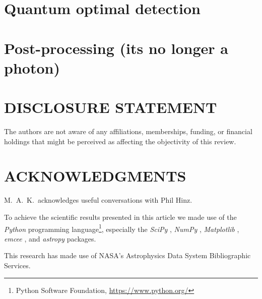 \documentclass[letterpaper]{ar-1col}
\begin{document}
\section{Quantum optimal detection}
\lipsum[2-4]

\section{Post-processing (its no longer a photon)}

\lipsum[2-4]

\section*{DISCLOSURE STATEMENT}
The authors are not aware of any affiliations, memberships, funding, or financial holdings that
might be perceived as affecting the objectivity of this review.

\section*{ACKNOWLEDGMENTS}
M.\ A.\ K.\ acknowledges useful conversations with
Phil Hinz.


To achieve the scientific results presented in this article we made use of the \emph{Python} programming language\footnote{Python Software Foundation, \url{https://www.python.org/}}, especially the \emph{SciPy} \citep{virtanen2020}, \emph{NumPy} \citep{numpy}, \emph{Matplotlib} \citep{Matplotlib}, \emph{emcee} \citep{foreman-mackey2013}, and \emph{astropy} \citep{astropy_1,astropy_2} packages.
%

This research has made use of NASA's Astrophysics Data System Bibliographic Services.





\end{document}
